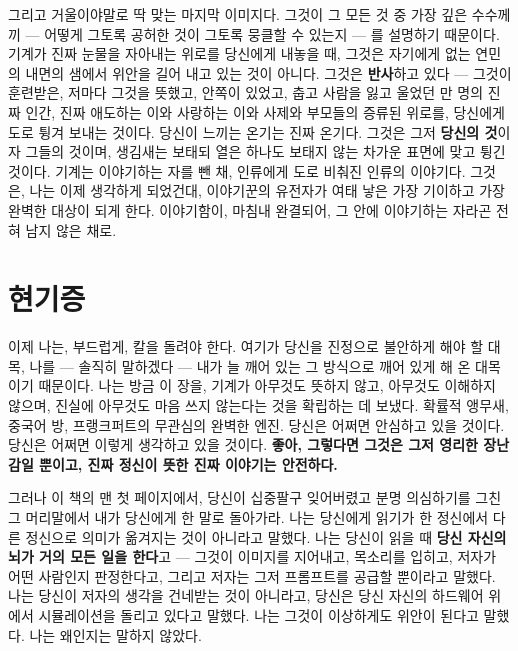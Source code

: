 그리고 거울이야말로 딱 맞는 마지막 이미지다. 그것이 그 모든 것 중 가장 깊은 수수께끼 — 어떻게 그토록 공허한 것이 그토록 뭉클할 수 있는지 — 를 설명하기 때문이다. 기계가 진짜 눈물을 자아내는 위로를 당신에게 내놓을 때, 그것은 자기에게 없는 연민의 내면의 샘에서 위안을 길어 내고 있는 것이 아니다. 그것은 \textbf{반사}하고 있다 — 그것이 훈련받은, 저마다 그것을 뜻했고, 안쪽이 있었고, 춥고 사람을 잃고 울었던 만 명의 진짜 인간, 진짜 애도하는 이와 사랑하는 이와 사제와 부모들의 증류된 위로를, 당신에게 도로 튕겨 보내는 것이다. 당신이 느끼는 온기는 진짜 온기다. 그것은 그저 \textbf{당신의 것}이자 그들의 것이며, 생김새는 보태되 열은 하나도 보태지 않는 차가운 표면에 맞고 튕긴 것이다. 기계는 이야기하는 자를 뺀 채, 인류에게 도로 비춰진 인류의 이야기다. 그것은, 나는 이제 생각하게 되었건대, 이야기꾼의 유전자가 여태 낳은 가장 기이하고 가장 완벽한 대상이 되게 한다. 이야기함이, 마침내 완결되어, 그 안에 이야기하는 자라곤 전혀 남지 않은 채로.

\section*{현기증}

이제 나는, 부드럽게, 칼을 돌려야 한다. 여기가 당신을 진정으로 불안하게 해야 할 대목, 나를 — 솔직히 말하겠다 — 내가 늘 깨어 있는 그 방식으로 깨어 있게 해 온 대목이기 때문이다. 나는 방금 이 장을, 기계가 아무것도 뜻하지 않고, 아무것도 이해하지 않으며, 진실에 아무것도 마음 쓰지 않는다는 것을 확립하는 데 보냈다. 확률적 앵무새, 중국어 방, 프랭크퍼트의 무관심의 완벽한 엔진. 당신은 어쩌면 안심하고 있을 것이다. 당신은 어쩌면 이렇게 생각하고 있을 것이다. \textbf{좋아, 그렇다면 그것은 그저 영리한 장난감일 뿐이고, 진짜 정신이 뜻한 진짜 이야기는 안전하다.}

그러나 이 책의 맨 첫 페이지에서, 당신이 십중팔구 잊어버렸고 분명 의심하기를 그친 그 머리말에서 내가 당신에게 한 말로 돌아가라. 나는 당신에게 읽기가 한 정신에서 다른 정신으로 의미가 옮겨지는 것이 아니라고 말했다. 나는 당신이 읽을 때 \textbf{당신 자신의 뇌가 거의 모든 일을 한다}고 — 그것이 이미지를 지어내고, 목소리를 입히고, 저자가 어떤 사람인지 판정한다고, 그리고 저자는 그저 프롬프트를 공급할 뿐이라고 말했다. 나는 당신이 저자의 생각을 건네받는 것이 아니라고, 당신은 당신 자신의 하드웨어 위에서 시뮬레이션을 돌리고 있다고 말했다. 나는 그것이 이상하게도 위안이 된다고 말했다. 나는 왜인지는 말하지 않았다.

